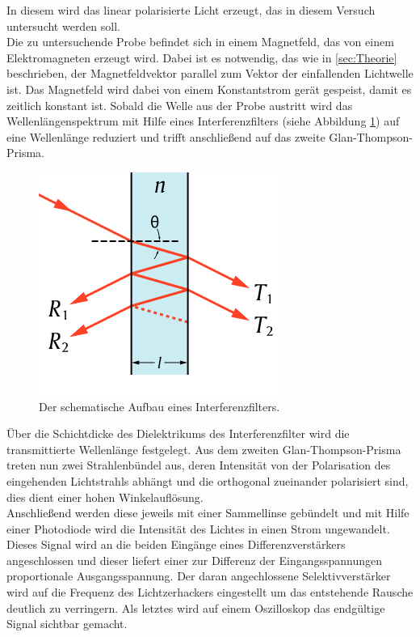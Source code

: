In diesem wird das linear polarisierte Licht erzeugt, das in diesem Versuch untersucht werden soll.\\ Die zu untersuchende Probe befindet sich in einem Magnetfeld, das von einem Elektromagneten erzeugt wird. Dabei ist es notwendig, das wie in
\ref{sec:Theorie} beschrieben, der Magnetfeldvektor parallel zum Vektor der einfallenden Lichtwelle ist. Das Magnetfeld wird dabei von einem Konstantstrom gerät gespeist, damit es zeitlich konstant ist. Sobald die Welle aus der Probe austritt wird das Wellenlängenspektrum mit Hilfe eines Interferenzfilters (siehe Abbildung \ref{fig:inter}) auf eine Wellenlänge reduziert und trifft anschließend auf das zweite Glan-Thompson-Prisma.
\begin{figure}[h!]
  \centering
  \includegraphics[scale=0.5]{fig/inter.png}
  \caption{Der schematische Aufbau eines Interferenzfilters. \cite{Anleitung4}}
  \label{fig:inter}
\end{figure}
Über die Schichtdicke des Dielektrikums des Interferenzfilter wird die transmittierte Wellenlänge festgelegt. Aus dem zweiten Glan-Thompson-Prisma treten nun zwei Strahlenbündel aus, deren
Intensität von der Polarisation des eingehenden Lichtstrahls abhängt und die orthogonal zueinander polarisiert sind, dies dient einer hohen Winkelauflösung.\\
Anschließend werden diese jeweils mit einer Sammellinse gebündelt und mit Hilfe einer Photodiode wird die Intensität des Lichtes in einen Strom ungewandelt. Dieses Signal wird an die beiden Eingänge eines
Differenzverstärkers angeschlossen und dieser liefert einer zur Differenz der Eingangsspannungen proportionale Ausgangsspannung. Der daran angechlossene Selektivverstärker wird auf die Frequenz des Lichtzerhackers eingestellt um
das entstehende Rausche deutlich zu verringern. Als letztes wird auf einem Oszilloskop das endgültige Signal sichtbar gemacht.
